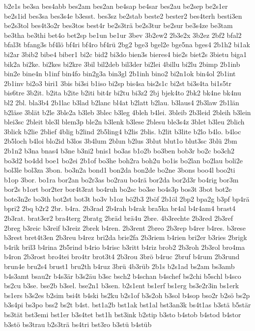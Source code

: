 {b2e1s
be3sa
bes4abb
bes2am
bes2an
be4sap
be4sar
bes2au
be2sep
be2s1er
be2s1id
bes3sa
bes3s4e
b3esst.
bes3sz
be2stab
beste2
bester2
bes4terh
besti3en
be2s3tol
bes4t3o2r
bes3tos
best4r
be2s3trä
be2s3tur
be2sur
be3s4ze
be3tam
be3tha
be3thi
bet4o
bet2sp
be1un
be1ur
3bev
3b2ew2
2b3e2x
3b2ez
2bf2
bfal2
bfal3t
bfang3s
bf4lö
bf4ri
bf4ro
bf4rü
2bg2
bge3
bgel2e
bge5na
bges4
2b1h2
bi1ak
bi2ar
3bib2
bibe4
biber1
bi2c
bid2
bi3do
bien3s
bieres4
bie2s
biet2s
3bietu
biga1
bik2a
bi2ke.
bi2kes
bi2kre
3bil
bil2deb
bil3der
bi2lei
4billu
bi2lu
2bimp
2b1inb
bin2e
bine4n
b1inf
bin4fo
bin2g3a
bin3gl
2b1inh
bino2
bi2n1ok
bin4ol
2b1int
2b1inv
bi2o3
biri1
3bis
bi3si
b1iso
bi2sp
bis4sa
bis2s1c
bi2st
bi3s4ta
bi1s5tr
bis6tre
3b2it.
b2ita
b2ite
b2iti
bit4r
bi2tu
bi3z2
2bj
bjek4to
2bk2
bk4ne
bk4nu
bl2
2bl.
bla3b4
2b1lac
b3lad
b2lanc
bl4at
b2latt
b2lau.
b3laus4
2b3law
2b1län
b2läse
3blät
b2le
3ble2a
b3leb
3blec
b3leg
4bleh
b4lei.
3bleib
2b3leid
2bleih
b3lein
blei3sc
2bleit
ble3l
blem3p
ble2n
b3lenk
b3lese
2blesu
ble3s4z
3blet
b3leu
2blich
3blick
b2lie
2blief
4blig
b2lind
2b5ling4
b2lis
2blis.
b2lit
b3lite
b2lo
b4lo.
b4loc
2b5loch
b4loi
blo2id
b3los
3b4lum
2blun
b2lus
3blut
blut1o
blut3sc
3blü
2bm
2b1n2
b3na
bnas4
b3ne
b3ni2
bnis1
bo3as
b1o2b
bo3ben
bob3r
bo2c
bo3ch2
bo3d2
bo4dd
boe1
bo2ei
2b1of
bo3he
boh2ra
boh2u
bo1is
bo2lan
bo2lau
boli2e
bol3le
bol3za
3bon.
bo3n2a
bond1
bon2da
bon2de
bo2ne
3bons
boo4l
boo2ti
b1op
3bor.
bo1ra
bor2an
bo2r3as
bo2rau
bo4rä
bor2da
bor2d3r
bo4rig
bor3m
bor2s
b1ort
bor2ter
bor4t3rat
bo4ruh
bo2sc
bo3se
bo4s3p
bos3t
3bot
bot2e
bote3n2e
bo3th
bot2st
bot3t
bo3v
b1oz
bö2b3
2böf
2b1öl
2bp2
bpa2g
b3pf
bp4rä
bpri2
2bq
b2r2
2br.
b4ra.
2b3rad
2b4rah
b4rak
bra5ka
br4al
b4r4am4
brast4
2b3rat.
brat3er2
bra4terg
2bratg
2bräd
brä4u
2bre.
4b3rechte
2b3red
2b3ref
2breg
b3reic
b3reif
b3reiz
2brek
b4ren.
2b3rent
2breo
2b3rep
b4rer
b4res.
b3rese
b3rest
bret4t3en
2b3reu
b4rez
bri2da
brie2fa
2b3riem
b4rien
bri2er
b3ries
2brigk
b4rik
bril3
b4rina
2b5rind
b4rio
b4risc
b3ritt
b4riz
brob2
2b3roh
2b3rol
bro4ma
b4ron
2b3rost
bro4tei
bro4tr
brot3t4
2b3rou
3brö
b4ruc
2bruf
b4rum
2b3rund
brun4e
bru2s4
brust1
bru2th
b4ruz
3brü
4b3rüb
2b1s
b2s1ad
bs2am
bs3amb
b4s3amt
bsau2r
b4s3är
b3s2äu
b3sc
bsch2
b4schan
b4schef
bs2chi
b5schl
b4sco
bs2cu
b3se.
bse2b
b3sel.
bse2n1
b3sen.
b2s1ent
bs1erf
bs1erg
bs3e2r3in
bs1erk
bs1ers
b3s2es
b2sim
bsi4t
b4ski
bs2ku
b2s1of
b3s2oh
b3sol
b4sop
bso2r
b2sö
bs2p
b3s4pi
bs3po
bss2
bs2t
b4st.
bst1a2b
bst1ak
bst1al
bst3an3k
bs4t1as
b3stä
b5stär
bs3tät
bst3emi
bst1er
b3s4tet
bst1h
bst3ink
b2stip
b3sto
b4stob
b4stod
b4stor
b3stö
bs3trau
b2s3trä
bs4tri
bst3ro
b3stü
b4stüb
}

